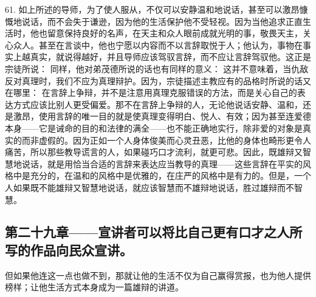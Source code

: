 61. 如上所述的导师，为了使人服从，不仅可以安静温和地说话，甚至可以激昂慷慨地说话，而不会失于谦逊，因为他的生活保护他不受轻视。因为当他追求正直生活时，他也留意保持良好的名声，在天主和众人眼前成就光明的事，敬畏天主，关心众人。甚至在言谈中，他也宁愿以内容而不以言辞取悦于人；他认为，事物在事实上越真实，就说得越好，并且导师应该驾驭言辞，而不应让言辞驾驭他。这正是宗徒所说： 同样，他对弟茂德所说的话也有同样的意义： 这并不意味着，当仇敌反对真理时，我们不应为真理辩护。因为，宗徒描述主教应有的品格时所说的话又在哪里： 在言辞上争辩，并不是注意用真理克服错误的方法，而是关心自己的表达方式应该比别人更受偏爱。那不在言辞上争辩的人，无论他说话安静、温和，还是激昂，使用言辞的唯一目的就是使真理变得明白、悦人、有效；因为甚至连爱德本身——它是诫命的目的和法律的满全——也不能正确地实行，除非爱的对象是真实的而非虚假的。因为正如一个人身体俊美而心灵丑恶，比他的身体也畸形更令人痛苦，所以那些教导谎言的人，如果碰巧口才流利，就更可悲。因此，既雄辩又智慧地说话，就是用恰当合适的言辞来表达应当教导的真理——这些言辞在平实的风格中是充分的，在温和的风格中是优雅的，在庄严的风格中是有力的。但是，一个人如果既不能雄辩又智慧地说话，就应该智慧而不雄辩地说话，胜过雄辩而不智慧。\par


\subsection{第二十九章——宣讲者可以将比自己更有口才之人所写的作品向民众宣讲。}

但如果他连这一点也做不到，那就让他的生活不仅为自己赢得赏报，也为他人提供榜样；让他生活方式本身成为一篇雄辩的讲道。\par

